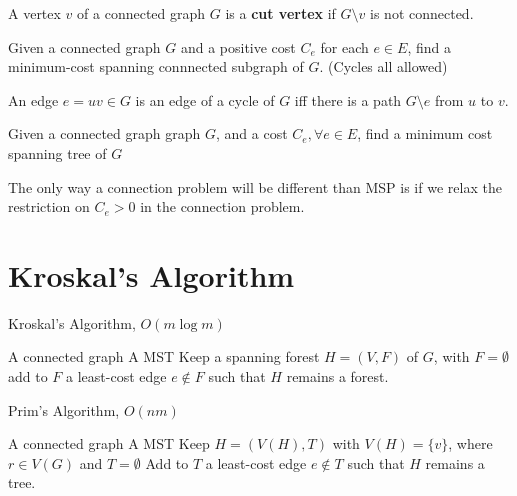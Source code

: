 			\begin{definition}
				A vertex $v$ of a connected graph $G$ is a \textbf{cut vertex} if $G\setminus v$ is not connected.
			\end{definition}

			\begin{definition}
				Given a connected graph $G$ and a positive cost $C_e$ for each $e\in E$, find a minimum-cost spanning connnected subgraph of $G$. (Cycles all allowed)
			\end{definition}

			\begin{lemma}
				An edge $e = uv \in G$ is an edge of a cycle of $G$ iff there is a path $G\setminus e$ from $u$ to $v$.
			\end{lemma}

			\begin{definition}
				Given a connected graph graph $G$, and a cost $C_e, \forall e\in E$, find a minimum cost spanning tree of $G$
			\end{definition}

			The only way a connection problem will be different than MSP is if we relax the restriction on $C_e > 0$ in the connection problem.

		\section{Kroskal's Algorithm}
			\begin{algorithm}
				\caption{Kroskal's Algorithm, $O(m \log m)$}
				\begin{algorithmic}
					\REQUIRE A connected graph
					\ENSURE A MST
					\STATE Keep a spanning forest $H=(V, F)$ of $G$, with $F=\emptyset$
						\STATE add to $F$ a least-cost edge $e\notin F$ such that $H$ remains a forest.
					\ENDWHILE
				\end{algorithmic}
			\end{algorithm}

			\begin{algorithm}
				\caption{Prim's Algorithm, $O(nm)$}
				\begin{algorithmic}
					\REQUIRE A connected graph
					\ENSURE A MST
					\STATE Keep $H = (V(H), T)$ with $V(H) = \{v\}$, where $r\in V(G)$ and $T=\emptyset$
					\WHILE {$|V(T)| < |V|$}
						\STATE Add to $T$ a least-cost edge $e \notin T$ such that $H$ remains a tree.
					\ENDWHILE
				\end{algorithmic}
			\end{algorithm}

